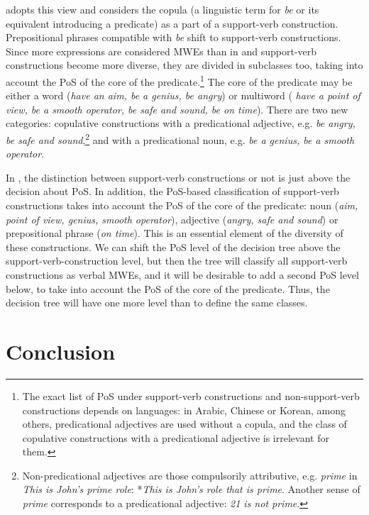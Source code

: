 \documentclass[output=paper]{langsci/langscibook}
\begin{document}
 adopts this view and considers the copula (a linguistic term for \textit{be} or its equivalent introducing a predicate) as a part of a support-verb construction. Prepositional phrases compatible with \textit{be} shift to support-verb constructions. Since more expressions are considered MWEs than in  and support-verb constructions become more diverse, they are divided in subclasses too, taking into account the PoS of the core of the predicate.\footnote{The exact list of PoS under support-verb constructions and non-support-verb constructions depends on languages: in Arabic, Chinese or Korean, among others, predicational adjectives are used without a copula, and the class of copulative constructions with a predicational adjective is irrelevant for them.} The core of the predicate may be either a word (\textit{have an aim,  be a genius,  be angry}) or multiword (\textit{ have a point of view, be a smooth operator, be safe and sound, be on time}). There are two new categories: copulative constructions with a predicational adjective, e.g. \textit{be angry, be safe and sound},\footnote{ Non-predicational adjectives are those compulsorily attributive, e.g. \textit{prime} in \textit{This is John’s prime role}: *\textit{This is John’s role that is prime}. Another sense of \textit{prime} corresponds to a predicational adjective: \textit{21 is not prime}.} and with a predicational noun, e.g. \textit{be a genius, be a smooth operator}. 

In , the distinction between support-verb constructions or not is just above the decision about PoS. In addition, the PoS-based classification of support-verb constructions takes into account the PoS of the core of the predicate: noun (\textit{aim, point of view, genius, smooth operator}), adjective (\textit{angry, safe and sound}) or prepositional phrase (\textit{on time}). This is an essential element of the diversity of these constructions. We can shift the PoS level of the decision tree above the support-verb-construction level, but then the tree will classify all support-verb constructions as verbal MWEs, and it will be desirable to add a second PoS level below, to take into account the PoS of the core of the predicate. Thus, the decision tree will have one more level than  to define the same classes.

\section{Conclusion}
\end{document}
